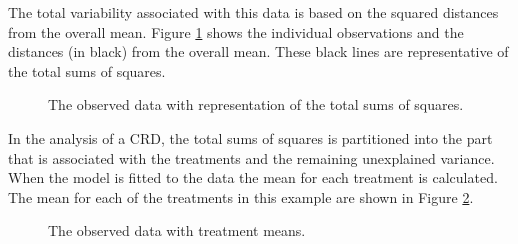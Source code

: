 \documentclass[a4paper, 10pt, fleqn, twosided]{memoir}
\begin{document}
The total variability associated with this data is based on the squared distances from the overall mean. Figure
\ref{fig:hypcrdtotss} shows the individual observations and the distances (in black) from the overall mean. These black
lines are representative of the total sums of squares.

\begin{figure}[!hbtp]
\centering
{}
\caption{The observed data with representation of the total sums of squares.}
\label{fig:hypcrdtotss}
\end{figure}

In the analysis of a CRD, the total sums of squares is partitioned into the part that is associated with the treatments
and the remaining unexplained variance. When the model is fitted to the data the mean for each treatment is calculated.
The mean for each of the treatments in this example are shown in Figure \ref{fig:hypcrdtrtmean}.


\begin{figure}[!hbtp]
\centering
{}
\caption{The observed data with treatment means.}
\label{fig:hypcrdtrtmean}
\end{figure}
\end{document}
